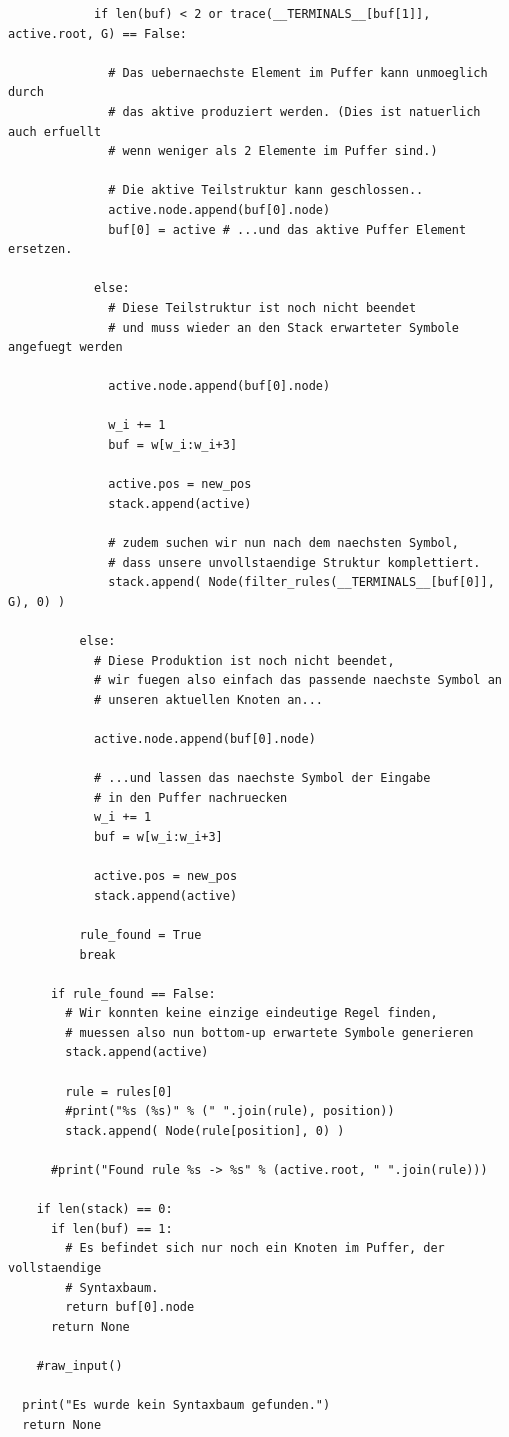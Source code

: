 \documentclass[12pt,a4paper]{article}
\theoremstyle{definition}
\begin{document}
\begin{verbatim}
            if len(buf) < 2 or trace(__TERMINALS__[buf[1]], active.root, G) == False:
              
              # Das uebernaechste Element im Puffer kann unmoeglich durch
              # das aktive produziert werden. (Dies ist natuerlich auch erfuellt
              # wenn weniger als 2 Elemente im Puffer sind.)
              
              # Die aktive Teilstruktur kann geschlossen..
              active.node.append(buf[0].node)
              buf[0] = active # ...und das aktive Puffer Element ersetzen.
            
            else:
              # Diese Teilstruktur ist noch nicht beendet
              # und muss wieder an den Stack erwarteter Symbole angefuegt werden

              active.node.append(buf[0].node)

              w_i += 1
              buf = w[w_i:w_i+3]
              
              active.pos = new_pos
              stack.append(active)
              
              # zudem suchen wir nun nach dem naechsten Symbol,
              # dass unsere unvollstaendige Struktur komplettiert.
              stack.append( Node(filter_rules(__TERMINALS__[buf[0]], G), 0) )
            
          else:
            # Diese Produktion ist noch nicht beendet,
            # wir fuegen also einfach das passende naechste Symbol an
            # unseren aktuellen Knoten an...

            active.node.append(buf[0].node)

            # ...und lassen das naechste Symbol der Eingabe
            # in den Puffer nachruecken
            w_i += 1
            buf = w[w_i:w_i+3]

            active.pos = new_pos
            stack.append(active)

          rule_found = True
          break    

      if rule_found == False:
        # Wir konnten keine einzige eindeutige Regel finden,
        # muessen also nun bottom-up erwartete Symbole generieren
        stack.append(active)
        
        rule = rules[0]
        #print("%s (%s)" % (" ".join(rule), position))
        stack.append( Node(rule[position], 0) )

      #print("Found rule %s -> %s" % (active.root, " ".join(rule)))

    if len(stack) == 0:
      if len(buf) == 1:
        # Es befindet sich nur noch ein Knoten im Puffer, der vollstaendige
        # Syntaxbaum.
        return buf[0].node
      return None

    #raw_input()

  print("Es wurde kein Syntaxbaum gefunden.")
  return None
	\end{verbatim}
\end{document}
